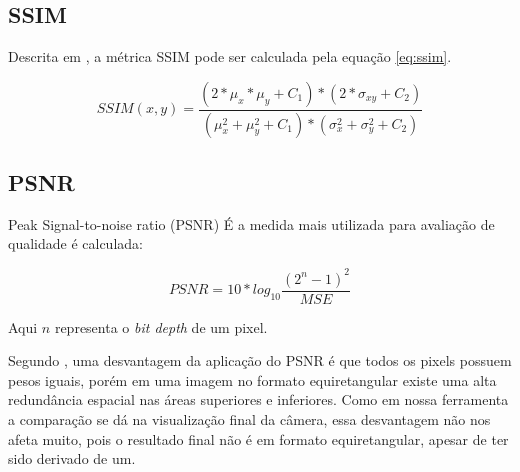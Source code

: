 \documentclass[conference]{IEEEtran}
\begin{document}
\subsection{SSIM}

Descrita em \cite{wang2004image}, a métrica SSIM pode ser calculada pela equação \ref{eq:ssim}.

\begin{equation}
SSIM(x,y)=\frac{(2*\mu_x*\mu_y+C_1)*(2*\sigma_{xy}+C_2)}{(\mu^2_x+\mu^2_y+C_1)*(\sigma^2_x+\sigma^2_y+C_2)}
\label{eq:ssim}
\end{equation}

\subsection{PSNR}

Peak Signal-to-noise ratio (PSNR) É a medida mais utilizada para avaliação de qualidade é calculada:

\begin{equation}
PSNR = 10*log_{10}{\frac{(2^n-1)^2}{MSE}}
\label{eq:psnr}
\end{equation}

Aqui $n$ representa o \textit{bit depth} de um pixel.

Segundo \cite{yu2015framework}, uma desvantagem da aplicação do PSNR é que todos os pixels possuem pesos iguais, porém em uma imagem no formato equiretangular existe uma alta redundância espacial nas áreas superiores e inferiores. Como em nossa ferramenta a comparação se dá na visualização final da câmera, essa desvantagem não nos afeta muito, pois o resultado final não é em formato equiretangular, apesar de ter sido derivado de um.



\end{document}
